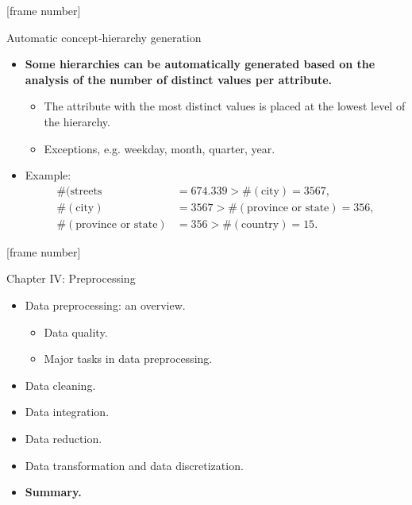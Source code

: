 \documentclass[aspectratio=169,t]{beamer}
\begin{document}
  {
    [frame number]
    \begin{frame}{Automatic concept-hierarchy generation}
        \begin{itemize}
            \item \textbf{Some hierarchies can be automatically generated based on the analysis of the number of distinct values per attribute.}
            \begin{itemize}
              \item The attribute with the most distinct values is placed at the lowest level of the hierarchy.
              \item Exceptions, e.g. weekday, month, quarter, year.
            \end{itemize}
            \item Example:
            \begin{align}
            \#(\text{streets} &= 674.339 > \#(\text{city}) =  3567,\\
            \#(\text{city}) &=  3567 > \#(\text{province or state}) =  356,\\
            \#(\text{province or state}) &=  356 > \#(\text{country}) = 15.
            \end{align}
        \end{itemize}
    \end{frame}
  }

  {
    [frame number]
    \begin{frame}{Chapter IV: Preprocessing}
        \begin{itemize}
            \item Data preprocessing: an overview.
            \begin{itemize}
              \item Data quality.
              \item Major tasks in data preprocessing.
            \end{itemize}
            \item Data cleaning.
            \item Data integration.
            \item Data reduction.
            \item Data transformation and data discretization.
            \item \textbf{Summary.}
        \end{itemize}
    \end{frame}
  }
\end{document}
